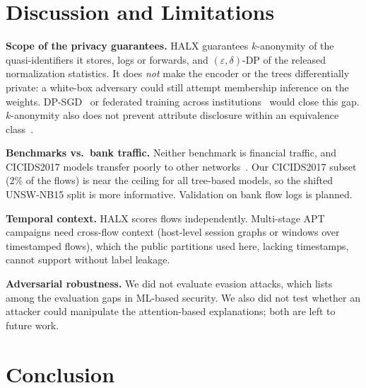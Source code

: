 \section{Discussion and Limitations}
\label{sec:discussion}
\textbf{Scope of the privacy guarantees.} HALX guarantees
$k$-anonymity of the quasi-identifiers it stores, logs or forwards, and
$(\varepsilon,\delta)$-DP of the released normalization statistics. It does
\emph{not} make the encoder or the trees differentially private: a
white-box adversary could still attempt membership inference on the
weights. DP-SGD~\cite{abadi2016dpsgd} or federated training across
institutions~\cite{mcmahan2017fedavg,ruzafa2023fl} would close this gap.
$k$-anonymity also does not prevent attribute disclosure within an
equivalence class~\cite{sweeney2002kanon}.

\textbf{Benchmarks vs.\ bank traffic.} Neither benchmark is financial
traffic, and CICIDS2017 models transfer poorly to other
networks~\cite{catillo2022transferability}. Our CICIDS2017 subset (2\% of
the flows) is near the ceiling for all tree-based models, so the shifted
UNSW-NB15 split is more informative. Validation on bank flow logs is
planned.

\textbf{Temporal context.} HALX scores flows independently. Multi-stage
APT campaigns need cross-flow context (host-level session graphs or
windows over timestamped flows), which the public partitions used here,
lacking timestamps, cannot support without label leakage.

\textbf{Adversarial robustness.} We did not evaluate evasion attacks, which
\cite{arp2022dos} lists among the evaluation gaps in ML-based security. We
also did not test whether an attacker could manipulate the attention-based
explanations; both are left to future work.

\section{Conclusion}
\label{sec:conclusion}

